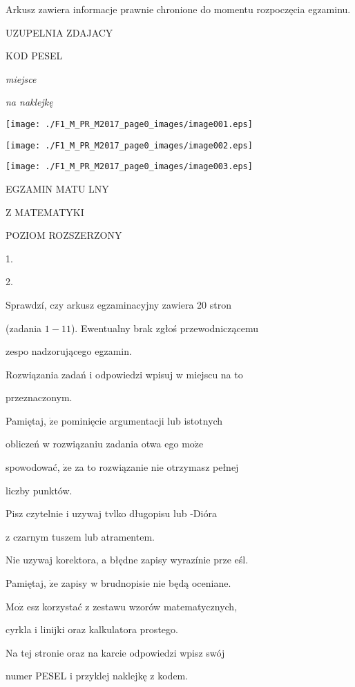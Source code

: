 \documentclass[a4paper,12pt]{article}
\begin{document}
Arkusz zawiera informacje prawnie chronione do momentu rozpoczęcia egzaminu.

UZUPELNIA ZDAJACY

KOD PESEL

{\it miejsce}

{\it na naklejkę}
\begin{center}
\texttt{[image: ./F1\_M\_PR\_M2017\_page0\_images/image001.eps]}

\texttt{[image: ./F1\_M\_PR\_M2017\_page0\_images/image002.eps]}

\texttt{[image: ./F1\_M\_PR\_M2017\_page0\_images/image003.eps]}
\end{center}
EGZAMIN MATU LNY

Z MATEMATYKI

POZIOM ROZSZERZONY

1.

2.

Sprawdzí, czy arkusz egzaminacyjny zawiera 20 stron

(zadania $1-11$). Ewentualny brak zgłoś przewodniczącemu

zespo nadzorującego egzamin.

Rozwiązania zadań i odpowiedzi wpisuj w miejscu na to

przeznaczonym.

Pamiętaj, $\dot{\mathrm{z}}\mathrm{e}$ pominięcie argumentacji lub istotnych

obliczeń w rozwiązaniu zadania otwa ego $\mathrm{m}\mathrm{o}\dot{\mathrm{z}}\mathrm{e}$

spowodować, $\dot{\mathrm{z}}\mathrm{e}$ za to rozwiązanie nie otrzymasz pełnej

liczby punktów.

Pisz czytelnie i uzywaj tvlko długopisu lub -Dióra

z czarnym tuszem lub atramentem.

Nie uzywaj korektora, a błędne zapisy wyrazínie prze eśl.

Pamiętaj, $\dot{\mathrm{z}}\mathrm{e}$ zapisy w brudnopisie nie będą oceniane.

$\mathrm{M}\mathrm{o}\dot{\mathrm{z}}$ esz korzystać z zestawu wzorów matematycznych,

cyrkla i linijki oraz kalkulatora prostego.

Na tej stronie oraz na karcie odpowiedzi wpisz swój

numer PESEL i przyklej naklejkę z kodem.
\end{document}
